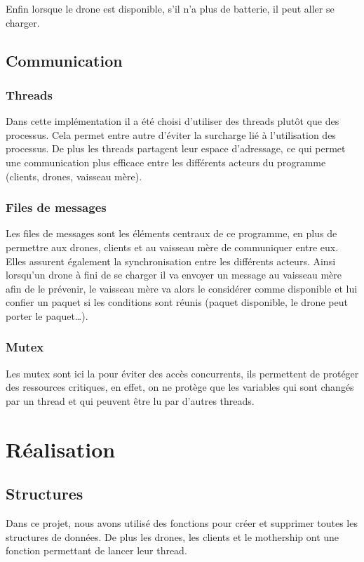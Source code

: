 \documentclass[article, backcover, french, nodocumentinfo]{upmethodology-document}
\begin{document}
			Enfin lorsque le drone est disponible, s'il n'a plus de batterie, il peut
			aller se charger.
		\subsection{Communication}
			\subsubsection{Threads}
				Dans cette implémentation il a été choisi d'utiliser des threads plutôt que des processus.
				Cela permet entre autre d'éviter la surcharge lié à l'utilisation des processus.
				De plus les threads partagent leur espace d'adressage, ce qui permet une communication
				plus efficace entre les différents acteurs du programme (clients, drones, vaisseau mère).
			\subsubsection{Files de messages}
				Les files de messages sont les éléments centraux de ce programme, en plus de permettre aux drones,
				clients et au vaisseau mère de communiquer entre eux. Elles assurent également la synchronisation entre
				les différents acteurs. Ainsi lorsqu'un drone à fini de se charger il va envoyer un message au vaisseau
				mère afin de le prévenir, le vaisseau mère va alors le considérer comme disponible et lui confier un paquet
				si les conditions sont réunis (paquet disponible, le drone peut porter le paquet\ldots).
			\subsubsection{Mutex}
				Les mutex sont ici la pour éviter des accès concurrents, ils permettent de protéger des ressources critiques,
				en effet, on ne protège que les variables qui sont changés par un thread et qui peuvent être lu par d'autres threads.

	\section{Réalisation}
		\subsection{Structures}
			Dans ce projet, nous avons utilisé des fonctions pour créer et supprimer toutes les structures de données.
			De plus les drones, les clients et le mothership ont une fonction permettant de lancer leur thread.
\end{document}
